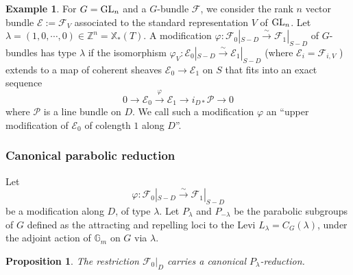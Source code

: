 \documentclass[reqno]{amsart}
\numberwithin{equation}{subsection}
\newtheorem{prop}[subsubsection]{Proposition}
\theoremstyle{definition}
\newtheorem{exam}[subsubsection]{Example}
\def\GG{\mathbb{G}}
\def\ZZ{\mathbb{Z}}
\newcommand\cE{\mathcal{E}}
\newcommand\cF{\mathcal{F}}
\newcommand\cP{\mathcal{P}}
\newcommand\GL{\textup{GL}}
\newcommand{\Gm}{\GG_m}
\newcommand\xcoch{\mathbb{X}_*}
\newcommand{\isom}{\stackrel{\sim}{\to}}
\newcommand\xr{\xrightarrow}
\newcommand{\ph}{\varphi}
\renewcommand{\l}{\lambda}
\begin{document}
\begin{exam}\label{ex: GL modif}
For $G=\GL_n$ and a $G$-bundle $\cF$, we consider the rank $n$ vector bundle $\cE:=\cF_V$ associated to the standard representation $V$ of $\GL_n$. Let $\l=(1,0,\cdots, 0)\in \ZZ^n=\xcoch(T)$.  A modification $\ph: \cF_0|_{S-D}\isom \cF_1|_{S-D}$ of $G$-bundles has type $\l$ if the isomorphism $\ph_V: \cE_0|_{S-D}\isom \cE_1|_{S-D}$ (where $\cE_i=\cF_{i,V}$ ) extends to a map of coherent sheaves $\cE_0\to\cE_1$ on $S$ that fits into an exact sequence
\begin{equation}\label{upper 1}
0\to \cE_0 \xr{\ph} \cE_1 \to i_{D*}\cP\to 0
\end{equation}
where $\cP$ is a line bundle on $D$. We call such a modification $\ph$ an ``upper modification of $\cE_0$ of colength $1$ along $D$''. 
\end{exam}





\subsubsection{Canonical parabolic reduction}\label{sssec: canonical parabolic reduction}
Let 
\begin{equation}\label{modif Gbun lambda}
\ph: \cF_{0}|_{S-D}\isom \cF_{1}|_{S-D}
\end{equation}
be a modification along $D$, of type $\lambda$. Let $P_{\l}$ and $P_{-\l}$ be the parabolic subgroups of $G$ defined as the attracting and repelling loci to the Levi $L_{\l}=C_{G}(\l)$, under the adjoint action of $\Gm$ on $G$ via $\l$.


\begin{prop}\label{prop:canonical-parabolic-red} The restriction $\cF_{0}|_{D}$ carries a canonical $P_{\l}$-reduction.
\end{prop}
\end{document}
